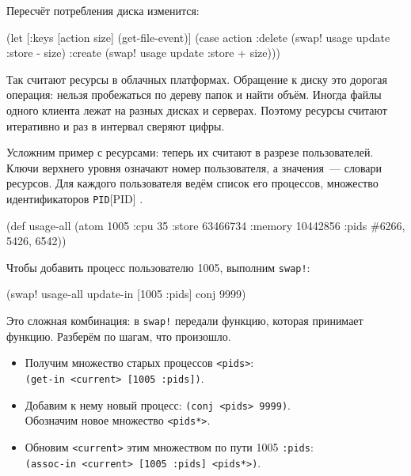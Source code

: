\noindent
Пересчёт потребления диска изменится:

\begin{english}
  \begin{clojure}
(let [{:keys [action size]} (get-file-event)]
  (case action
    :delete
    (swap! usage update :store - size)
    :create
    (swap! usage update :store + size)))
  \end{clojure}
\end{english}


Так считают ресурсы в облачных платформах. Обращение к диску это дорогая
операция: нельзя пробежаться по дереву папок и найти объём. Иногда файлы
одного клиента лежат на разных дисках и серверах. Поэтому ресурсы считают
итеративно и раз в интервал сверяют цифры.


Усложним пример с ресурсами: теперь их считают в разрезе пользователей. Ключи
верхнего уровня означают номер пользователя, а значения~--- словари
ресурсов. Для каждого пользователя ведём список его процессов, множество
идентификаторов \verb|PID|[PID]
.

\begin{english}
  \begin{clojure/lines}
(def usage-all
  (atom {1005 {:cpu 35
               :store 63466734
               :memory 10442856
               :pids #{6266, 5426, 6542}}}))
  \end{clojure/lines}
\end{english}

\noindent
Чтобы добавить процесс пользователю 1005, выполним \verb|swap!|:

\begin{english}
  \begin{clojure}
(swap! usage-all update-in [1005 :pids] conj 9999)
  \end{clojure}
\end{english}

Это сложная комбинация: в \verb|swap!| передали функцию, которая принимает
функцию. Разберём по шагам, что произошло.

\begin{itemize}

\item
  Получим множество старых процессов \verb|<pids>|:\\
  \verb|(get-in <current> [1005 :pids])|.

\item
  Добавим к нему новый процесс: \verb|(conj <pids> 9999)|.\\
  Обозначим новое множество \verb|<pids*>|.

\item
  Обновим \verb|<current>| этим множеством по пути 1005 \arr{} \verb|:pids|:\\
  \verb|(assoc-in <current> [1005 :pids] <pids*>)|.

\end{itemize}

